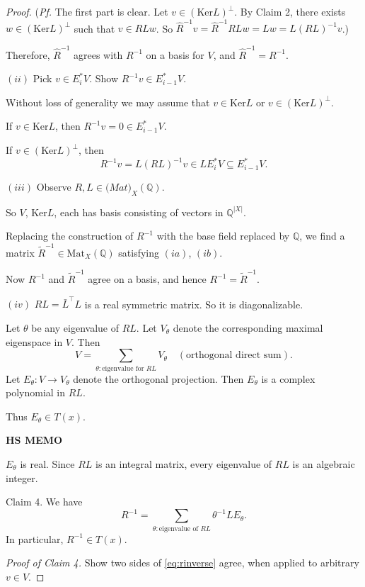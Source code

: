 \documentclass[
]{book}
\theoremstyle{definition}
\theoremstyle{definition}
\theoremstyle{definition}
\theoremstyle{definition}
\theoremstyle{remark}
\begin{document}
\begin{proof}
(\emph{Pf.} The first part is clear. Let \(v\in (\mathrm{Ker}L)^\bot\). By Claim 2, there exists \(w\in (\mathrm{Ker}L)^\bot\) such that \(v\in RLw\). So \(\hat{R}^{-1}v = \hat{R}^{-1}RLw = Lw = L(RL)^{-1}v\).)

Therefore, \(\hat{R}^{-1}\) agrees with \(R^{-1}\) on a basis for \(V\), and \(\hat{R}^{-1} = R^{-1}\).

\((ii)\) Pick \(v\in E^*_iV\). Show \(R^{-1}v\in E^*_{i-1}V\).

Without loss of generality we may assume that \(v\in \mathrm{Ker}L\) or \(v\in (\mathrm{Ker}L)^\bot\).

If \(v\in \mathrm{Ker}L\), then \(R^{-1}v = 0\in E^*_{i-1}V\).

If \(v\in (\mathrm{Ker}L)^\bot\), then
\[R^{-1}v = L(RL)^{-1}v \in LE^*_iV \subseteq E^*_{i-1}V.\]

\((iii)\) Observe \(R, L\in \mathrm(Mat)_X(\mathbb{Q})\).

So \(V\), \(\mathrm{Ker}L\), each has basis consisting of vectors in \(\mathbb{Q}^{|X|}\).

Replacing the construction of \(R^{-1}\) with the base field replaced by \(\mathbb{Q}\), we find a matrix \(\tilde{R}^{-1}\in \mathrm{Mat}_X(\mathbb{Q})\) satisfying \((ia)\), \((ib)\).

Now \(R^{-1}\) and \(\tilde{R}^{-1}\) agree on a basis, and hence \(R^{-1} = \tilde{R}^{-1}\).

\((iv)\) \(RL = \bar{L}^\top L\) is a real symmetric matrix. So it is diagonalizable.

Let \(\theta\) be any eigenvalue of \(RL\). Let \(V_\theta\) denote the corresponding maximal eigenspace in \(V\).
Then
\[V = \sum_{\theta:\text{eigenvalue for }RL}V_\theta \quad (\text{orthogonal direct sum}).\]
Let \(E_\theta: V\to V_\theta\) denote the orthogonal projection. Then \(E_\theta\) is a complex polynomial in \(RL\).

Thus \(E_\theta\in T(x)\).

\textbf{HS MEMO}

\(E_\theta\) is real. Since \(RL\) is an integral matrix, every eigenvalue of \(RL\) is an algebraic integer.

Claim 4. We have
\begin{equation}
R^{-1} = \sum_{\theta: \text{eigenvalue of }RL}\theta^{-1}LE_\theta. \label{eq:rinverse}
\end{equation}
In particular, \(R^{-1}\in T(x)\).

\emph{Proof of Claim 4.}
Show two sides of \eqref{eq:rinverse} agree, when applied to arbitrary \(v\in V\).


\end{proof}
\end{document}
